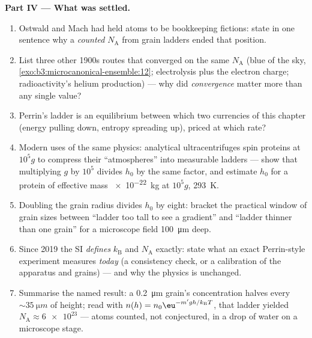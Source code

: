 \begin{problem}
\medskip\noindent\textbf{Part IV --- What was settled.}
\begin{enumerate}[resume]
  \item Ostwald and Mach had held atoms to be bookkeeping
        fictions: state in one sentence why a \emph{counted}
        $N_{\text{A}}$ from grain ladders ended that position.
  \item List three other 1900s routes that converged on the same
        $N_{\text{A}}$ (blue of the sky,
        \cref{exo:b3:microcanonical-ensemble:12}; electrolysis
        plus the electron charge; radioactivity's helium
        production) --- why did \emph{convergence} matter more
        than any single value?
  \item Perrin's ladder is an equilibrium between which two
        currencies of this chapter (energy pulling down, entropy
        spreading up), priced at which rate?
  \item Modern uses of the same physics: analytical
        ultracentrifuges spin proteins at $10^5g$ to compress
        their ``atmospheres'' into measurable ladders --- show
        that multiplying $g$ by $10^5$ divides $h_0$ by the same
        factor, and estimate $h_0$ for a protein of effective
        mass \qty{e-22}{kg} at $10^5g$, \qty{293}{K}.
  \item Doubling the grain radius divides $h_0$ by eight: bracket
        the practical window of grain sizes between ``ladder too
        tall to see a gradient'' and ``ladder thinner than one
        grain'' for a microscope field \qty{100}{\micro m} deep.
  \item Since 2019 the SI \emph{defines} $k_{\text{B}}$ and
        $N_{\text{A}}$ exactly: state what an exact Perrin-style
        experiment measures \emph{today} (a consistency check, or
        a calibration of the apparatus and grains) --- and why the
        physics is unchanged.
  \item Summarise the named result: a \qty{0.2}{\micro m} grain's
        concentration halves every $\sim\qty{35}{\micro m}$ of
        height; read with $n(h) = n_0\eu^{-m'gh/k_{\text{B}}T}$,
        that ladder yielded $N_{\text{A}} \approx \num{6e23}$ ---
        atoms counted, not conjectured, in a drop of water on a
        microscope stage.
\end{enumerate}
\end{problem}
